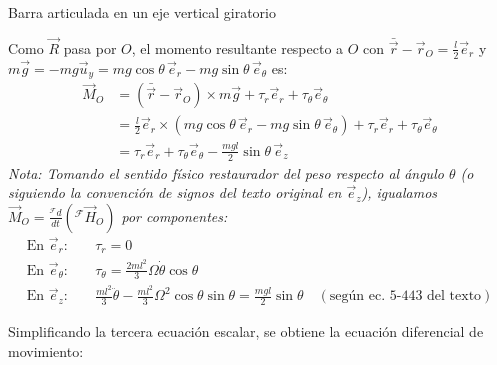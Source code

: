 \begin{solucion}{Barra articulada en un eje vertical giratorio}
\begin{center}
\end{center}

Como $\vec{R}$ pasa por $O$, el momento resultante respecto a $O$ con $\bar{\vec{r}} - \vec{r}_O = \frac{l}{2}\vec{e}_r$ y $m\vec{g} = -mg\vec{u}_y = mg\cos\theta\,\vec{e}_r - mg\sin\theta\,\vec{e}_\theta$ es:
\begin{align}
    \vec{M}_O &= (\bar{\vec{r}} - \vec{r}_O) \times m\vec{g} + \tau_r\vec{e}_r + \tau_\theta\vec{e}_\theta \nonumber \\
    &= \frac{l}{2}\vec{e}_r \times (mg\cos\theta\,\vec{e}_r - mg\sin\theta\,\vec{e}_\theta) + \tau_r\vec{e}_r + \tau_\theta\vec{e}_\theta \nonumber \\
    &= \tau_r\vec{e}_r + \tau_\theta\vec{e}_\theta - \frac{mgl}{2}\sin\theta\,\vec{e}_z
\end{align}
\textit{Nota: Tomando el sentido físico restaurador del peso respecto al ángulo $\theta$ (o siguiendo la convención de signos del texto original en $\vec{e}_z$), igualamos $\vec{M}_O = \frac{{}^{\mathcal{F}}d}{dt}({}^{\mathcal{F}}\vec{H}_O)$ por componentes:}
\begin{align}
    \text{En }\vec{e}_r: \quad & \tau_r = 0 \\
    \text{En }\vec{e}_\theta: \quad & \tau_\theta = \frac{2ml^2}{3}\Omega\dot{\theta}\cos\theta \\
    \text{En }\vec{e}_z: \quad & \frac{ml^2}{3}\ddot{\theta} - \frac{ml^2}{3}\Omega^2\cos\theta\sin\theta = \frac{mgl}{2}\sin\theta \quad (\text{según ec. 5-443 del texto})
\end{align}

Simplificando la tercera ecuación escalar, se obtiene la ecuación diferencial de movimiento:
\end{solucion}
